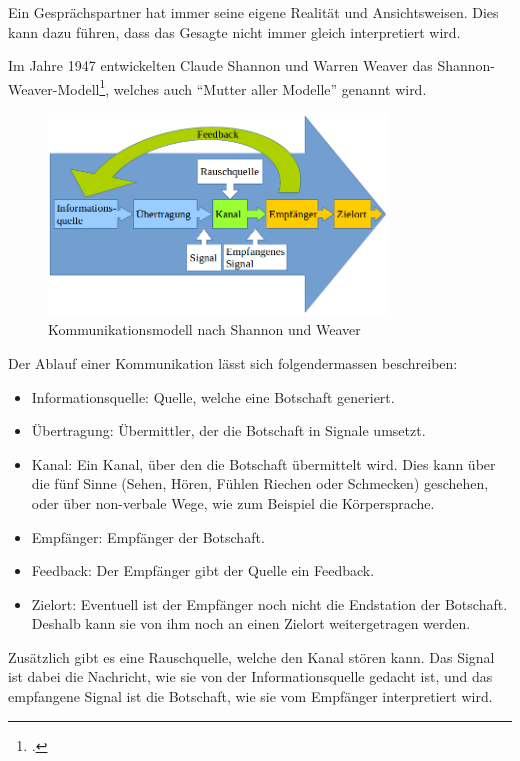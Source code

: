 Ein Gesprächspartner hat immer seine eigene Realität und Ansichtsweisen. Dies kann dazu führen, dass das Gesagte nicht immer gleich interpretiert wird. 

Im Jahre 1947 entwickelten Claude Shannon und Warren Weaver das Shannon-Weaver-Modell\footcite{Das_Kommunikationsmodell_von_ShannonWeaver_2015-06-29}, welches auch "`Mutter aller Modelle"' genannt wird.

\begin{figure}[H]
  \centering
  \includegraphics[width=0.8\textwidth]{images/shannon-weaver-model.png}
  \caption[Kommunikationsmodell nach Shannon und Weaver]{Kommunikationsmodell nach Shannon und Weaver}
  \label{fig:socialengineering:Kommunikation:Kommunikationsmodell:shannon-weaver-model}
\end{figure}

Der Ablauf einer Kommunikation lässt sich folgendermassen beschreiben:
\begin{itemize}
\item Informationsquelle: Quelle, welche eine Botschaft generiert.
\item Übertragung: Übermittler, der die Botschaft in Signale umsetzt.
\item Kanal: Ein Kanal, über den die Botschaft übermittelt wird. Dies kann über die fünf Sinne (Sehen, Hören, Fühlen Riechen oder Schmecken) geschehen, oder über non-verbale Wege, wie zum Beispiel die Körpersprache.
\item Empfänger: Empfänger der Botschaft.
\item Feedback: Der Empfänger gibt der Quelle ein Feedback.
\item Zielort: Eventuell ist der Empfänger noch nicht die Endstation der Botschaft. Deshalb kann sie von ihm noch an einen Zielort weitergetragen werden.
\end{itemize}
Zusätzlich gibt es eine Rauschquelle, welche den Kanal stören kann. Das Signal ist dabei die Nachricht, wie sie von der Informationsquelle gedacht ist, und das empfangene Signal ist die Botschaft, wie sie vom Empfänger interpretiert wird.

